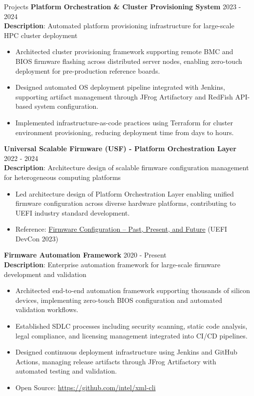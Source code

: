\documentclass{resume} %
\begin{document}
\begin{rSection}{Projects}
\textbf{Platform Orchestration \& Cluster Provisioning System} \hfill {2023 - 2024}\\
\textbf{Description}: Automated platform provisioning infrastructure for large-scale HPC cluster deployment

\begin{itemize}
    \item Architected cluster provisioning framework supporting remote BMC and BIOS firmware flashing across distributed server nodes, enabling zero-touch deployment for pre-production reference boards.
    \item Designed automated OS deployment pipeline integrated with Jenkins, supporting artifact management through JFrog Artifactory and RedFish API-based system configuration.
    \item Implemented infrastructure-as-code practices using Terraform for cluster environment provisioning, reducing deployment time from days to hours.
\end{itemize}

\textbf{Universal Scalable Firmware (USF) - Platform Orchestration Layer} \hfill {2022 - 2024} \\
\textbf{Description}: Architecture design of scalable firmware configuration management for heterogeneous computing platforms

\begin{itemize}
    \item Led architecture design of Platform Orchestration Layer enabling unified firmware configuration across diverse hardware platforms, contributing to UEFI industry standard development.
    \item Reference: \href{https://uefi.org/sites/default/files/resources/Firmware%20Configuration%20%E2%80%93%20Past%2C%20Present%2C%20and%20Future_Zimmer.pdf}{Firmware Configuration – Past, Present, and Future} (UEFI DevCon 2023)
\end{itemize}

\textbf{Firmware Automation Framework}  \hfill {2020 - Present} \\
\textbf{Description}: Enterprise automation framework for large-scale firmware development and validation

\begin{itemize}
    \item Architected end-to-end automation framework supporting thousands of silicon devices, implementing zero-touch BIOS configuration and automated validation workflows.
    \item Established SDLC processes including security scanning, static code analysis, legal compliance, and licensing management integrated into CI/CD pipelines.
    \item Designed continuous deployment infrastructure using Jenkins and GitHub Actions, managing release artifacts through JFrog Artifactory with automated testing and validation.
    \item Open Source: \href{https://github.com/intel/xml-cli}{https://github.com/intel/xml-cli}
\end{itemize}


\end{rSection}
\end{document}
